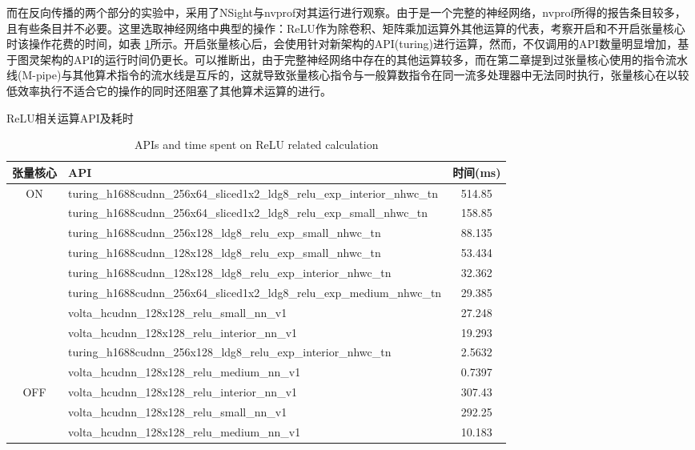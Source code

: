 \par 而在反向传播的两个部分的实验中，采用了NSight与nvprof对其运行进行观察。由于是一个完整的神经网络，nvprof所得的报告条目较多，且有些条目并不必要。这里选取神经网络中典型的操作：ReLU作为除卷积、矩阵乘加运算外其他运算的代表，考察开启和不开启张量核心时该操作花费的时间，如表 \ref{table-RELU}所示。开启张量核心后，会使用针对新架构的API(turing)进行运算，然而，不仅调用的API数量明显增加，基于图灵架构的API的运行时间仍更长。可以推断出，由于完整神经网络中存在的其他运算较多，而在第二章提到过张量核心使用的指令流水线(M-pipe)与其他算术指令的流水线是互斥的，这就导致张量核心指令与一般算数指令在同一流多处理器中无法同时执行，张量核心在以较低效率执行不适合它的操作的同时还阻塞了其他算术运算的进行。
\begin{table}
	\centering
	\renewcommand{\thetable}{\arabic{section}-\arabic{table} }
	\renewcommand{\tablename}{表}
	\caption{ReLU相关运算API及耗时}
	\addtocounter{table}{-1}
	\renewcommand{\thetable}{\arabic{section}-\arabic{table} }
	\renewcommand{\tablename}{Table}
	\caption{APIs and time spent on ReLU related calculation}
	\begin{tabular}{clc}
		\toprule
		张量核心 & API	&	时间(ms)\\
		\midrule
		ON & turing\_h1688cudnn\_256x64\_sliced1x2\_ldg8\_relu\_exp\_interior\_nhwc\_tn & 514.85\\
		   & turing\_h1688cudnn\_256x64\_sliced1x2\_ldg8\_relu\_exp\_small\_nhwc\_tn & 158.85\\
		   & turing\_h1688cudnn\_256x128\_ldg8\_relu\_exp\_small\_nhwc\_tn & 88.135\\
		   & turing\_h1688cudnn\_128x128\_ldg8\_relu\_exp\_small\_nhwc\_tn & 53.434\\
		   & turing\_h1688cudnn\_128x128\_ldg8\_relu\_exp\_interior\_nhwc\_tn & 32.362\\
		   & turing\_h1688cudnn\_256x64\_sliced1x2\_ldg8\_relu\_exp\_medium\_nhwc\_tn & 29.385\\
		   & volta\_hcudnn\_128x128\_relu\_small\_nn\_v1 & 27.248\\
		   & volta\_hcudnn\_128x128\_relu\_interior\_nn\_v1 & 19.293\\
		   & turing\_h1688cudnn\_256x128\_ldg8\_relu\_exp\_interior\_nhwc\_tn & 2.5632\\
		   & volta\_hcudnn\_128x128\_relu\_medium\_nn\_v1 & 0.7397\\
		\midrule
		OFF& volta\_hcudnn\_128x128\_relu\_interior\_nn\_v1 & 307.43\\
		   & volta\_hcudnn\_128x128\_relu\_small\_nn\_v1 & 292.25\\
		   & volta\_hcudnn\_128x128\_relu\_medium\_nn\_v1 & 10.183\\
		\bottomrule
	\end{tabular} \label{table-RELU} 
\end{table}
